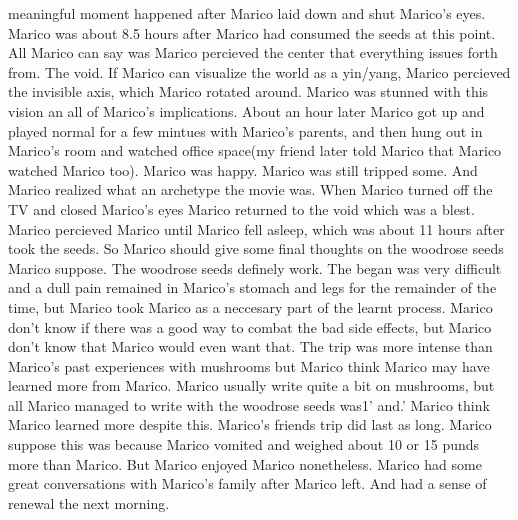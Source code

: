 \documentclass[12pt]{book}
\begin{document}
meaningful moment happened after Marico laid down and shut Marico's eyes. Marico was about 8.5 hours after Marico had consumed the seeds at this point. All Marico can say was Marico percieved the center that everything issues forth from. The void. If Marico can visualize the world as a yin/yang, Marico percieved the invisible axis, which Marico rotated around. Marico was stunned with this vision an all of Marico's implications. About an hour later Marico got up and played normal for a few mintues with Marico's parents, and then hung out in Marico's room and watched office space(my friend later told Marico that Marico watched Marico too). Marico was happy. Marico was still tripped some. And Marico realized what an archetype the movie was. When Marico turned off the TV and closed Marico's eyes Marico returned to the void which was a blest. Marico percieved Marico until Marico fell asleep, which was about 11 hours after took the seeds. So Marico should give some final thoughts on the woodrose seeds Marico suppose. The woodrose seeds definely work. The began was very difficult and a dull pain remained in Marico's stomach and legs for the remainder of the time, but Marico took Marico as a neccesary part of the learnt process. Marico don't know if there was a good way to combat the bad side effects, but Marico don't know that Marico would even want that. The trip was more intense than Marico's past experiences with mushrooms but Marico think Marico may have learned more from Marico. Marico usually write quite a bit on mushrooms, but all Marico managed to write with the woodrose seeds was1' and.' Marico think Marico learned more despite this. Marico's friends trip did last as long. Marico suppose this was because Marico vomited and weighed about 10 or 15 punds more than Marico. But Marico enjoyed Marico nonetheless. Marico had some great conversations with Marico's family after Marico left. And had a sense of renewal the next morning.
\end{document}

